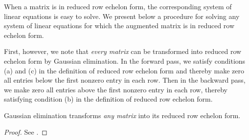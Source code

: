 \begin{remark} \label{remark 3.4.5}
When a matrix is in reduced row echelon form, the corresponding system of linear equations is easy to solve.
We present below a procedure for solving any system of linear equations for which the augmented matrix is in reduced row echelon form.

First, however, we note that \emph{every matrix} can be transformed into reduced row echelon form by Gaussian elimination.
In the forward pass, we satisfy conditions (a) and (c) in the definition of reduced row echelon form and thereby make zero all entries below the first nonzero entry in each row.
Then in the backward pass, we make zero all entries above the first nonzero entry in each row, thereby satisfying condition (b) in the
definition of reduced row echelon form.
\end{remark}

\begin{theorem} \label{thm 3.14}
Gaussian elimination transforms \emph{any matrix} into its reduced row echelon form.
\end{theorem}

\begin{proof}
See .
\end{proof}

